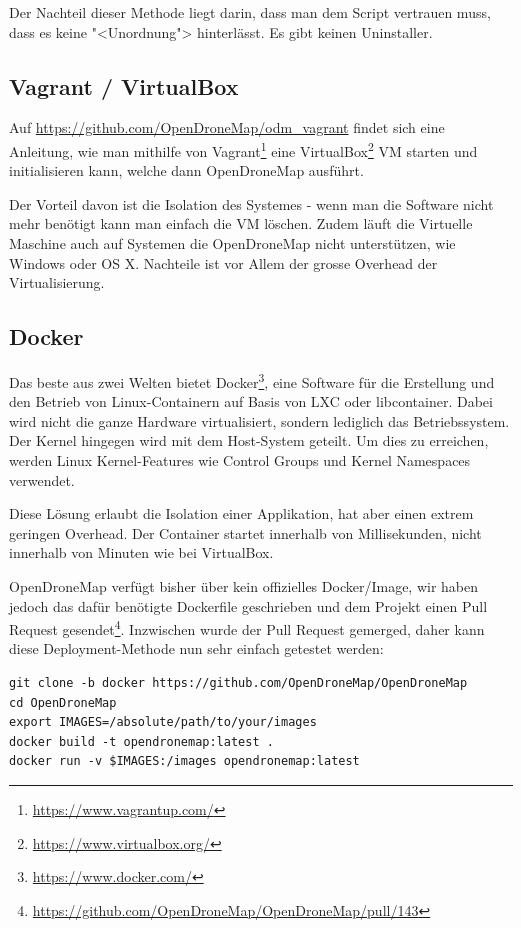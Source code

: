 \noindent Der Nachteil dieser Methode liegt darin, dass man dem Script vertrauen
muss, dass es keine "<Unordnung"> hinterlässt. Es gibt keinen Uninstaller.

\subsection{Vagrant / VirtualBox}

Auf \url{https://github.com/OpenDroneMap/odm_vagrant} findet sich eine
Anleitung, wie man mithilfe von
Vagrant\footnote{\url{https://www.vagrantup.com/}} eine
VirtualBox\footnote{\url{https://www.virtualbox.org/}} VM starten und
initialisieren kann, welche dann OpenDroneMap ausführt.

Der Vorteil davon ist die Isolation des Systemes - wenn man die Software nicht
mehr benötigt kann man einfach die VM löschen. Zudem läuft die Virtuelle
Maschine auch auf Systemen die OpenDroneMap nicht unterstützen, wie Windows oder
OS X. Nachteile ist vor Allem der grosse Overhead der Virtualisierung.

\subsection{Docker}

Das beste aus zwei Welten bietet Docker\footnote{\url{https://www.docker.com/}},
eine Software für die Erstellung und den Betrieb von Linux-Containern auf Basis
von LXC oder libcontainer. Dabei wird nicht die ganze Hardware virtualisiert,
sondern lediglich das Betriebssystem. Der Kernel hingegen wird mit dem
Host-System geteilt. Um dies zu erreichen, werden Linux Kernel-Features wie
Control Groups und Kernel Namespaces verwendet.

Diese Lösung erlaubt die Isolation einer Applikation, hat aber einen extrem
geringen Overhead. Der Container startet innerhalb von Millisekunden, nicht
innerhalb von Minuten wie bei VirtualBox.

OpenDroneMap verfügt bisher über kein offizielles Docker\-/Image, wir haben
jedoch das dafür benötigte Dockerfile geschrieben und dem Projekt einen Pull
Request
gesendet\footnote{\url{https://github.com/OpenDroneMap/OpenDroneMap/pull/143}}.
Inzwischen wurde der Pull Request gemerged, daher kann diese Deployment-Methode
nun sehr einfach getestet werden:

\vspace{0.5\baselineskip}
\begin{verbatim} 
git clone -b docker https://github.com/OpenDroneMap/OpenDroneMap
cd OpenDroneMap
export IMAGES=/absolute/path/to/your/images
docker build -t opendronemap:latest .
docker run -v $IMAGES:/images opendronemap:latest
\end{verbatim}

